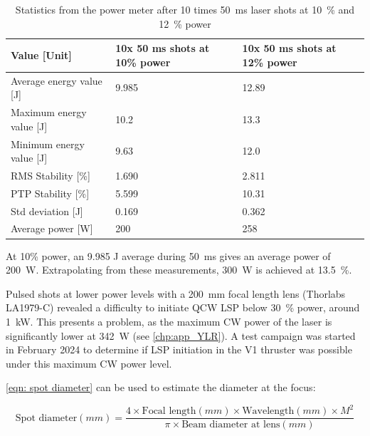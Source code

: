             \begin{table}[!ht]
                \caption{Statistics from the power meter after 10 times \qty{50}{ms} laser shots at \qty{10}{\%} and \qty{12}{\%} power}
                \label{tab:laser shot statistics}
                \begin{tabular}{lll}
                \textbf{Value {[}Unit{]}} & \textbf{10x 50 ms shots at 10\% power} & \textbf{10x 50 ms shots at 12\% power} \\ \hline
                Average energy value {[}J{]}  & 9.985 & 12.89 \\
                Maximum energy value {[}J{]}  & 10.2  & 13.3  \\
                Minimum energy value {[}J{]}  & 9.63  & 12.0  \\
                RMS Stability {[}\%{]} & 1.690 & 2.811 \\
                PTP Stability {[}\%{]} & 5.599 & 10.31 \\
                Std deviation {[}J{]}  & 0.169 & 0.362 \\
                Average power {[}W{]}  & 200 & 258  \\ \hline
                \end{tabular}
            \end{table}
            
            At 10\% power, an 9.985 J average during \qty{50}{ms} gives an average power of \qty{200}{W}. Extrapolating from these measurements, \qty{300}{W} is achieved at \qty{13.5}{\%}.

            Pulsed shots at lower power levels with a \qty{200}{mm} focal length lens (Thorlabs LA1979-C) revealed a difficulty to initiate QCW LSP below \qty{30}{\%} power, around \qty{1}{kW}. This presents a problem, as the maximum CW power of the laser is significantly lower at \qty{342}{W} (see \autoref{chp:app_YLR}). A test campaign was started in February 2024 to determine if LSP initiation in the V1 thruster was possible under this maximum CW power level.

            
            \autoref{eqn: spot diameter} \cite{LaserSpotSize} can be used to estimate the diameter at the focus:
            
            \begin{equation}\label{eqn: spot diameter}
                \text{Spot diameter}(mm) = \frac{4 \times \text{Focal length}(mm) \times \text{Wavelength}(mm) \times M^2}{\pi \times \text{Beam diameter at lens}(mm)}
            \end{equation}

